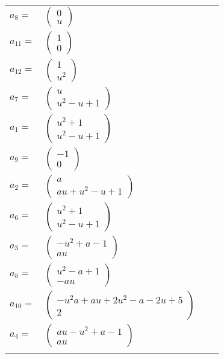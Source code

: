 \documentclass[1p]{elsarticle_modified}
\theoremstyle{definition}
\begin{document}
\begin{tabular}{m{7pt} m{180pt} m{7pt} m{180pt} }
\flushright $a_{8}=$&$\begin{pmatrix}0\\u\end{pmatrix}$ \\
\flushright $a_{11}=$&$\begin{pmatrix}1\\0\end{pmatrix}$ \\
\flushright $a_{12}=$&$\begin{pmatrix}1\\u^2\end{pmatrix}$ \\
\flushright $a_{7}=$&$\begin{pmatrix}u\\u^2- u+1\end{pmatrix}$ \\
\flushright $a_{1}=$&$\begin{pmatrix}u^2+1\\u^2- u+1\end{pmatrix}$ \\
\flushright $a_{9}=$&$\begin{pmatrix}-1\\0\end{pmatrix}$ \\
\flushright $a_{2}=$&$\begin{pmatrix}a\\a u+u^2- u+1\end{pmatrix}$ \\
\flushright $a_{6}=$&$\begin{pmatrix}u^2+1\\u^2- u+1\end{pmatrix}$ \\
\flushright $a_{3}=$&$\begin{pmatrix}- u^2+a-1\\a u\end{pmatrix}$ \\
\flushright $a_{5}=$&$\begin{pmatrix}u^2- a+1\\- a u\end{pmatrix}$ \\
\flushright $a_{10}=$&$\begin{pmatrix}- u^2 a+a u+2 u^2- a-2 u+5\\2\end{pmatrix}$ \\
\flushright $a_{4}=$&$\begin{pmatrix}a u- u^2+a-1\\a u\end{pmatrix}$\\&\end{tabular}
\end{document}
